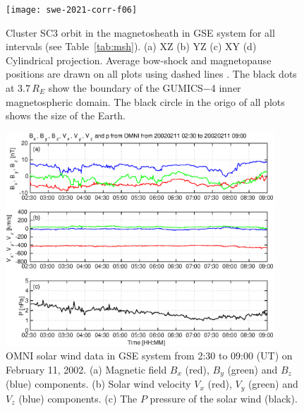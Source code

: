 \documentclass[linenumbers,draft]{agujournal}
\begin{document}
\pagebreak

\begin{figure}[h]
\centering
\texttt{[image: swe-2021-corr-f06]} 
\caption{Cluster SC3 orbit in the magnetosheath in GSE system for all intervals (see Table~\ref{tab:msh}). (a) XZ (b) YZ (c) XY (d) Cylindrical projection. Average bow-shock and magnetopause positions are drawn on all plots using dashed lines \citep[][respectively]{peredo95:_three_alfven_mach,tsyganenko95:_model_earth}. The black dots at $3.7\,R_E$ show the boundary of the GUMICS$-$4 inner magnetospheric domain. The black circle in the origo of all plots shows the size of the Earth.}
\label{fig:mshorbit}
\end{figure}

\pagebreak

\begin{figure}[h]
\centering
\includegraphics[width=0.9\textwidth,angle=0]{swe-2021-corr-f07} 
\caption{OMNI solar wind data in GSE system from 2:30 to 09:00 (UT) on February 11, 2002. (a) Magnetic field $B_{x}$ (red), $B_{y}$ (green) and $B_{z}$ (blue) components. (b) Solar wind velocity $V_{x}$ (red), $V_{y}$ (green) and $V_{z}$ (blue) components. (c) The $P$ pressure of the solar wind (black).}
\label{fig:mshomni}
\end{figure}

\pagebreak
\end{document}
